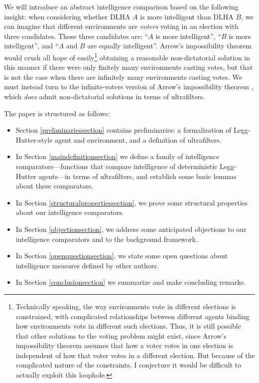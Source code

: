 \documentclass[twoside,11pt]{article}
\begin{document}
We will introduce an abstract intelligence comparison
based on the following insight:
when considering whether DLHA $A$ is more intelligent than DLHA $B$,
we can imagine that different environments are \emph{voters} voting in an election with
three candidates. Those three candidates are: ``$A$ is more intelligent'',
``$B$ is more intelligent'', and ``$A$ and $B$ are equally intelligent''.
Arrow's impossibility theorem \citep{arrow} would crush all hope of
easily\footnote{Technically speaking, the way environments vote in different elections
is constrained, with complicated relationships between different agents binding how
environments vote in different such elections. Thus, it is still possible that
other solutions to the voting problem might exist, since Arrow's impossibility theorem
assumes that
how a voter votes in one election is independent of how that voter votes
in a different election. But
because of the complicated nature of the constraints, I conjecture it
would be difficult to actually exploit this loophole.}
obtaining a
reasonable non-dictatorial solution in this manner if there were only finitely many
environments
casting votes, but that is not the case when there are infinitely many environments
casting votes.
We must instead turn to the infinite-voters version of
Arrow's impossibility theorem \citep{kirman} \citep[see also][]{fishburn},
which \emph{does} admit non-dictatorial solutions in terms of ultrafilters.

The paper is structured as follows:
\begin{itemize}
    \item Section \ref{preliminariessection} contains preliminaries:
    a formalization of Legg-Hutter-style agent and
    environment, and a definition of ultrafilters.
    \item
    In Section \ref{maindefinitionsection} we define a family of intelligence
    comparators---functions that compare intelligence of
    deterministic Legg-Hutter agents---in terms of ultrafilters, and
    establish some basic lemmas about these comparators.
    \item
    In Section \ref{structuralpropertiessection}, we prove some structural
    properties about our intelligence comparators.
    \item
    In Section \ref{objectionsection}, we address some anticipated objections
    to our intelligence comparators and to the background framework.
    \item
    In Section \ref{openquestionsection}, we state some open questions about
    intelligence measures defined by other authors.
    \item
    In Section \ref{conclusionsection} we summarize and make concluding remarks.
\end{itemize}
\end{document}
